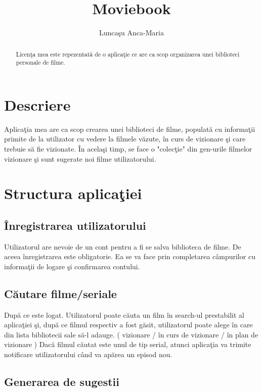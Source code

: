 \documentclass[a4paper]{article}
\title{Moviebook}
\author{Luncaşu Anca-Maria}
\begin{document}
\maketitle

\begin{abstract}
Licenţa mea este repezentată de o aplicaţie ce are ca scop organizarea unei biblioteci personale de filme.
\end{abstract}

\section{Descriere}

Aplicaţia mea are ca scop crearea unei biblioteci de filme, populată cu informaţii primite de la utilizator cu vedere la filmele văzute, în curs de vizionare şi care trebuie să fie vizionate. În acelaşi timp, se face o "colecţie" din gen-urile filmelor vizionare şi sunt sugerate noi filme utilizatorului.

\section{Structura aplicaţiei}

\subsection{Înregistrarea utilizatorului}

Utilizatorul are nevoie de un cont pentru a fi se salva biblioteca de filme. De aceea înregistrarea este obligatorie. Ea se va face prin completarea câmpurilor cu informaţii de logare şi confirmarea contului.

\subsection{Căutare filme/seriale}

După ce este logat. Utilizatorul poate căuta un film în search-ul prestabilit al aplicaţiei şi, după ce filmul respectiv a fost găsit, utilizatorul poate alege în care din lista bibliotecii sale să-l adauge. ( vizionare / în curs de vizionare / în plan de vizionare ) Dacă filmul căutat este unul de tip serial, atunci aplicaţia va trimite notificare utilizatorului când va apărea un episod nou.

\subsection{Generarea de sugestii}
\end{document}
